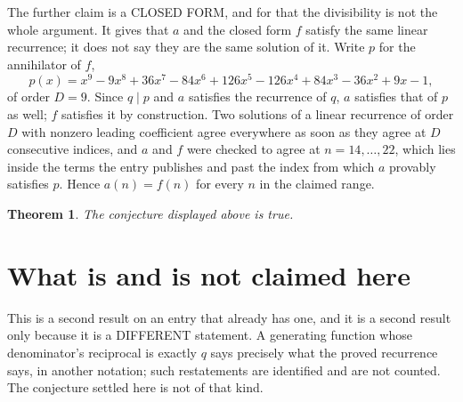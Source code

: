 \documentclass[11pt,a4paper]{article}
\theoremstyle{plain}
\newtheorem{theorem}{Theorem}
\theoremstyle{definition}
\begin{document}
The further claim is a CLOSED FORM, and for that the divisibility is not the whole argument. It
gives that $a$ and the closed form $f$ satisfy the same linear recurrence; it does not say they
are the same solution of it. Write $p$ for the annihilator of $f$,
\[
  p(x)=x^{9} - 9 x^{8} + 36 x^{7} - 84 x^{6} + 126 x^{5} - 126 x^{4} + 84 x^{3} - 36 x^{2} + 9 x - 1 ,
\]
of order $D=9$. Since $q\mid p$ and $a$ satisfies the recurrence of $q$, $a$ satisfies that of
$p$ as well; $f$ satisfies it by construction. Two solutions of a linear recurrence of order $D$
with nonzero leading coefficient agree everywhere as soon as they agree at $D$ consecutive
indices, and $a$ and $f$ were checked to agree at $n=14,\dots,22$,
which lies inside the terms the entry publishes and past the index from which $a$ provably
satisfies $p$. Hence $a(n)=f(n)$ for every $n$ in the claimed range.

\begin{theorem}
The conjecture displayed above is true.
\end{theorem}

\section{What is and is not claimed here}

This is a second result on an entry that already has one, and it is a second result only because
it is a DIFFERENT statement. A generating function whose denominator's reciprocal is exactly $q$
says precisely what the proved recurrence says, in another notation; such restatements are
identified and are not counted. The conjecture settled here is not of that kind.
\end{document}
